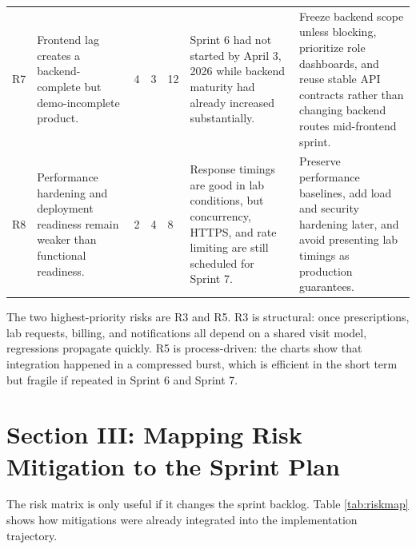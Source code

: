 \documentclass[conference]{IEEEtran}
\begin{document}
\begin{table}[t]
\begin{tabular}{p{0.75cm} p{3.35cm} p{0.8cm} p{0.8cm} p{0.95cm} p{4.7cm} p{4.25cm}}
R7 & Frontend lag creates a backend-complete but demo-incomplete product. & 4 & 3 & 12 & Sprint 6 had not started by April 3, 2026 while backend maturity had already increased substantially. & Freeze backend scope unless blocking, prioritize role dashboards, and reuse stable API contracts rather than changing backend routes mid-frontend sprint. \\
R8 & Performance hardening and deployment readiness remain weaker than functional readiness. & 2 & 4 & 8 & Response timings are good in lab conditions, but concurrency, HTTPS, and rate limiting are still scheduled for Sprint 7. & Preserve performance baselines, add load and security hardening later, and avoid presenting lab timings as production guarantees. \\
\hline
\end{tabular}
\label{tab:riskmatrix}
\end{table}

The two highest-priority risks are R3 and R5. R3 is structural: once prescriptions, lab requests, billing, and notifications all depend on a shared visit model, regressions propagate quickly. R5 is process-driven: the charts show that integration happened in a compressed burst, which is efficient in the short term but fragile if repeated in Sprint 6 and Sprint 7.

\section{Section III: Mapping Risk Mitigation to the Sprint Plan}
The risk matrix is only useful if it changes the sprint backlog. Table \ref{tab:riskmap} shows how mitigations were already integrated into the implementation trajectory.
\end{document}
